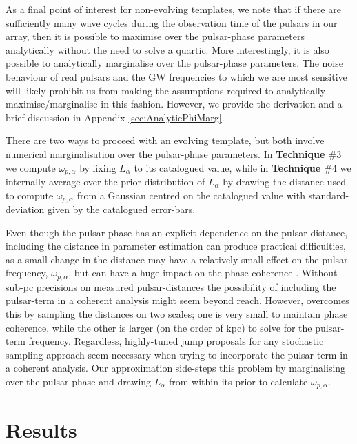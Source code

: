 \documentclass[twocolappendix,tighten]{emulateapj}
\begin{document}
As a final point of interest for non-evolving templates, we note that if there are sufficiently many wave cycles during the observation time of the pulsars in our array, then it is possible to maximise over the pulsar-phase parameters analytically without the need to solve a quartic. More interestingly, it is also possible to analytically marginalise over the pulsar-phase parameters. The noise behaviour of real pulsars and the GW frequencies to which we are most sensitive will likely prohibit us from making the assumptions required to analytically maximise/marginalise in this fashion. However, we provide the derivation and a brief discussion in Appendix \ref{sec:AnalyticPhiMarg}.

There are two ways to proceed with an evolving template, but both involve numerical marginalisation over the pulsar-phase parameters. In {\bf Technique $\#3$} we compute $\omega_{p,\alpha}$ by fixing $L_{\alpha}$ to its catalogued value, while in {\bf Technique $\#4$} we internally average over the prior distribution of $L_{\alpha}$ by drawing the distance used to compute $\omega_{p,\alpha}$ from a Gaussian centred on the catalogued value with standard-deviation given by the catalogued error-bars.

Even though the pulsar-phase has an explicit dependence on the pulsar-distance, including the distance in parameter estimation can produce practical difficulties, as a small change in the distance may have a relatively small effect on the pulsar frequency, $\omega_{p,\alpha}$, but can have a huge impact on the phase coherence \citep{corbin-cornish-2010,ellisbayesian2013}. Without sub-pc precisions on measured pulsar-distances the possibility of including the pulsar-term in a coherent analysis might seem beyond reach. However, \citet{ellisbayesian2013} overcomes this by sampling the distances on two scales; one is very small to maintain phase coherence, while the other is larger (on the order of kpc) to solve for the pulsar-term frequency. Regardless, highly-tuned jump proposals for any stochastic sampling approach seem necessary when trying to incorporate the pulsar-term in a coherent analysis. Our approximation side-steps this problem by marginalising over the pulsar-phase and drawing $L_{\alpha}$ from within its prior to calculate $\omega_{p,\alpha}$.

\section{Results} \label{sec:singlesourceresults}
\end{document}
